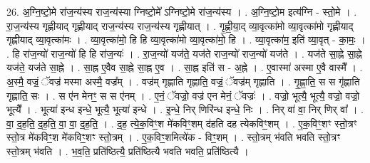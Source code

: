 \documentclass[17pt]{extarticle}
\begin{document}
26. अ॒ग्नि॒ष्टो॒मे रा॑ज॒न्य॑स्य राज॒न्य॑स्या ग्निष्टो॒मे᳚ ऽग्निष्टो॒मे रा॑ज॒न्य॑स्य । . अ॒ग्नि॒ष्टो॒म इत्य॑ग्नि - स्तो॒मे । . रा॒ज॒न्य॑स्य गृह्णीयाद् गृह्णीयाद् राज॒न्य॑स्य राज॒न्य॑स्य गृह्णीयात् । . गृ॒ह्णी॒या॒द् व्या॒वृत्का॑मो व्या॒वृत्का॑मो गृह्णीयाद् गृह्णीयाद् व्या॒वृत्का॑मः । . व्या॒वृत्का॑मो॒ हि हि व्या॒वृत्का॑मो व्या॒वृत्का॑मो॒ हि । . व्या॒वृत्का॑म॒ इति॑ व्या॒वृत् - का॒मः॒ । . हि रा॑ज॒न्यो॑ राज॒न्यो॑ हि हि रा॑ज॒न्यः॑ । . रा॒ज॒न्यो॑ यज॑ते॒ यज॑ते राज॒न्यो॑ राज॒न्यो॑ यज॑ते । . यज॑ते सा॒ह्ने सा॒ह्ने यज॑ते॒ यज॑ते सा॒ह्ने । . सा॒ह्न ए॒वैव सा॒ह्ने सा॒ह्न ए॒व । . सा॒ह्न इति॑ स - अ॒ह्ने । . ए॒वास्मा॑ अस्मा ए॒वै वास्मै᳚ । . अ॒स्मै॒ वज्रं॒ ॅवज्र॑ मस्मा अस्मै॒ वज्र᳚म् । . वज्र॑म् गृह्णाति गृह्णाति॒ वज्रं॒ ॅवज्र॑म् गृह्णाति । . गृ॒ह्णा॒ति॒ स स गृ॑ह्णाति गृह्णाति॒ सः । . स ए॑न मेनꣳ॒॒ स स ए॑नम् । . ए॒नं॒ ॅवज्रो॒ वज्र॑ एन मेनं॒ ॅवज्रः॑ । . वज्रो॒ भूत्यै॒ भूत्यै॒ वज्रो॒ वज्रो॒ भूत्यै᳚ । . भूत्या॑ इन्ध इन्धे॒ भूत्यै॒ भूत्या॑ इन्धे । . इ॒न्धे॒ निर् णिरि॑न्ध इन्धे॒ निः । . निर् वा॑ वा॒ निर् णिर् वा᳚ । . वा॒ द॒ह॒ति॒ द॒ह॒ति॒ वा॒ वा॒ द॒ह॒ति॒ । . द॒ह॒ त्ये॒क॒विꣳ॒॒श मे॑कविꣳ॒॒शम् द॑हति दह त्येकविꣳ॒॒शम् । . ए॒क॒विꣳ॒॒शꣳ स्तो॒त्रꣳ स्तो॒त्र मे॑कविꣳ॒॒श मे॑कविꣳ॒॒शꣳ स्तो॒त्रम् । . ए॒क॒विꣳ॒॒शमित्ये॑क - विꣳ॒॒शम् । . स्तो॒त्रम् भ॑वति भवति स्तो॒त्रꣳ स्तो॒त्रम् भ॑वति । . भ॒व॒ति॒ प्रति॑ष्ठित्यै॒ प्रति॑ष्ठित्यै भवति भवति॒ प्रति॑ष्ठित्यै । \newline
\end{document}
